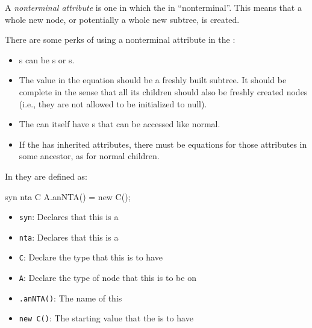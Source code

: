 \begin{definition}\label{def:Nonterminal_Attribute}
  A \emph{nonterminal attribute} is one in which the  in ``nonterminal''.
  This means that a whole new node, or potentially a whole new subtree, is created.

  There are some perks of using a nonterminal attribute in the :
  \begin{itemize}[noitemsep]
  \item {}s can be s or s.
  \item The value in the equation should be a freshly built  subtree.
    It should be complete in the sense that all its children should also be freshly created nodes (i.e., they are not allowed to be initialized to null).
  \item The  can itself have s that can be accessed like normal.
  \item If the  has inherited attributes, there must be equations for those attributes in some ancestor, as for normal children.

  \end{itemize}
  In \JastAdd{} they are defined as:
\begin{javasource}
  syn nta C A.anNTA() = new C();
\end{javasource}
  \begin{itemize}[noitemsep]
  \item \texttt{syn}: Declares that this  is a 
  \item \texttt{nta}: Declares that this  is a 
  \item \texttt{C}: Declare the type that this  is to have
  \item \texttt{A}: Declare the type of  node that this  is to be on
  \item \texttt{.anNTA()}: The name of this 
  \item \texttt{new C()}: The starting value that the  is to have
  \end{itemize}
\end{definition}

